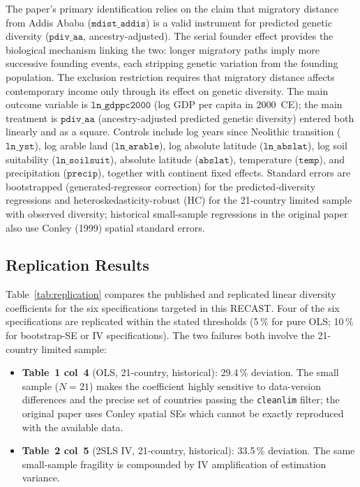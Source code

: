 \documentclass[12pt,letterpaper]{article}
\begin{document}
The paper's primary identification relies on the claim that migratory distance
from Addis Ababa ($\texttt{mdist\_addis}$) is a valid instrument for predicted
genetic diversity ($\texttt{pdiv\_aa}$, ancestry-adjusted).
The serial founder effect provides the biological mechanism linking the two:
longer migratory paths imply more successive founding events, each stripping
genetic variation from the founding population.
The exclusion restriction requires that migratory distance affects contemporary
income only through its effect on genetic diversity.
The main outcome variable is $\texttt{ln\_gdppc2000}$ (log GDP per capita in
2000~CE); the main treatment is $\texttt{pdiv\_aa}$ (ancestry-adjusted predicted
genetic diversity) entered both linearly and as a square.
Controls include log years since Neolithic transition ($\texttt{ln\_yst}$),
log arable land ($\texttt{ln\_arable}$), log absolute latitude ($\texttt{ln\_abslat}$),
log soil suitability ($\texttt{ln\_soilsuit}$), absolute latitude ($\texttt{abslat}$),
temperature ($\texttt{temp}$), and precipitation ($\texttt{precip}$), together
with continent fixed effects.
Standard errors are bootstrapped (generated-regressor correction) for the
predicted-diversity regressions and heteroskedasticity-robust (HC) for the
21-country limited sample with observed diversity; historical small-sample
regressions in the original paper also use Conley (1999) spatial standard errors.

\subsection{Replication Results}

Table~\ref{tab:replication} compares the published and replicated linear
diversity coefficients for the six specifications targeted in this RECAST.
Four of the six specifications are replicated within the stated thresholds
(5\,\% for pure OLS; 10\,\% for bootstrap-SE or IV specifications).
The two failures both involve the 21-country limited sample:

\begin{itemize}
  \item \textbf{Table~1 col~4} (OLS, 21-country, historical): 29.4\,\% deviation.
    The small sample ($N=21$) makes the coefficient highly sensitive to
    data-version differences and the precise set of countries passing the
    \texttt{cleanlim} filter; the original paper uses Conley spatial SEs
    which cannot be exactly reproduced with the available data.
  \item \textbf{Table~2 col~5} (2SLS IV, 21-country, historical): 33.5\,\% deviation.
    The same small-sample fragility is compounded by IV amplification of
    estimation variance.
\end{itemize}
\end{document}
